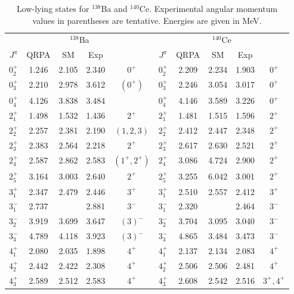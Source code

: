 \begin{table}[htbp]
\begin{center}
\caption{Low-lying states for $^{138}$Ba and $^{140}$Ce. Experimental 
angular
momentum values in parentheses are tentative. Energies are given in MeV.}
\begin{tabular}{ccccc|ccccc}
\hline
\multicolumn{5}{c|}{$^{138}$Ba} & \multicolumn{5}{c}{$^{140}$Ce} \\
$J^{\pi}$ & QRPA & SM & Exp & & $J^{\pi}$ &  
QRPA & SM & Exp & \\ 
\hline
$0^{+}_{2}$ & 1.246 & 2.105 & 2.340 & $0^{+}$ &
$0^{+}_{2}$ & 2.209 & 2.234 & 1.903 & $0^{+}$ \\
$0^{+}_{3}$ & 2.210 & 2.978 & 3.612 & $(0^{+})$ &
$0^{+}_{3}$ & 2.246 & 3.054 & 3.017 & $0^{+}$ \\
$0^{+}_{4}$ & 4.126 & 3.838 & 3.484 &         &
$0^{+}_{4}$ & 4.146 & 3.589 & 3.226 & $0^{+}$ \\
$2^{+}_{1}$ & 1.498 & 1.532 & 1.436 & $2^{+}$ &
$2^{+}_{1}$ & 1.481 & 1.515 & 1.596 & $2^{+}$ \\
$2^{+}_{2}$ & 2.257 & 2.381 & 2.190 & $(1,2,3)$ &
$2^{+}_{2}$ & 2.412 & 2.447 & 2.348 & $2^{+}$ \\
$2^{+}_{3}$ & 2.383 & 2.564 & 2.218 & $2^{+}$ &
$2^{+}_{3}$ & 2.617 & 2.630 & 2.521 & $2^{+}$ \\
$2^{+}_{4}$ & 2.587 & 2.862 & 2.583 & $(1^{+},2^{+})$ &
$2^{+}_{4}$ & 3.086 & 4.724 & 2.900 & $2^{+}$ \\
$2^{+}_{5}$ & 3.164 & 3.003 & 2.640 & $2^{+}$ &
$2^{+}_{5}$ & 3.255 & 6.042 & 3.001 & $2^{+}$ \\
$3^{+}_{1}$ & 2.347 & 2.479 & 2.446 & $3^{+}$ &
$3^{+}_{1}$ & 2.510 & 2.557 & 2.412 & $3^{+}$ \\
$3^{-}_{1}$ & 2.737 &       & 2.881 & $3^{-}$ &
$3^{-}_{1}$ & 2.320 &       & 2.464 & $3^{-}$ \\
$3^{-}_{2}$ & 3.919 & 3.699 & 3.647 & $(3)^{-}$ &
$3^{-}_{2}$ & 3.704 & 3.095 & 3.040 & $3^{-}$ \\
$3^{-}_{3}$ & 4.789 & 4.118 & 3.923 & $(3)^{-}$ &
$3^{-}_{3}$ & 4.865 & 3.484 & 3.473 & $3^{-}$ \\
$4^{+}_{1}$ & 2.080 & 2.035 & 1.898 & $4^{+}$ &
$4^{+}_{1}$ & 2.137 & 2.134 & 2.083 & $4^{+}$ \\
$4^{+}_{2}$ & 2.442& 2.422 & 2.308 & $4^{+}$ &
$4^{+}_{2}$ & 2.506 & 2.506 & 2.481 & $4^{+}$ \\
$4^{+}_{3}$ & 2.589 & 2.512 & 2.583 & $4^{+}$ &
$4^{+}_{3}$ & 2.608 & 2.542 & 2.516 & $3^{+},4^{+}$ \\

\end{tabular}
\end{center}
\end{table}
